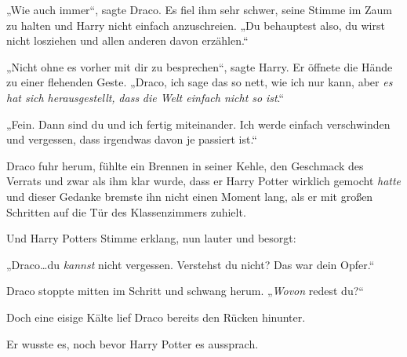„Wie auch immer“, sagte Draco. Es fiel ihm sehr schwer, seine Stimme im Zaum zu halten und Harry nicht einfach anzuschreien. „Du behauptest also, du wirst nicht losziehen und allen anderen davon erzählen.“

„Nicht ohne es vorher mit dir zu besprechen“, sagte Harry. Er öffnete die Hände zu einer flehenden Geste. „Draco, ich sage das so nett, wie ich nur kann, aber \emph{es hat sich herausgestellt,} \emph{dass} \emph{die Welt einfach nicht so} \emph{ist}.“

„Fein. Dann sind du und ich fertig miteinander. Ich werde einfach verschwinden und vergessen, dass irgendwas davon je passiert ist.“

Draco fuhr herum, fühlte ein Brennen in seiner Kehle, den Geschmack des Verrats und zwar als ihm klar wurde, dass er Harry Potter wirklich gemocht \emph{hatte} und dieser Gedanke bremste ihn nicht einen Moment lang, als er mit großen Schritten auf die Tür des Klassenzimmers zuhielt.

Und Harry Potters Stimme erklang, nun lauter und besorgt:

„Draco…du \emph{kannst} nicht vergessen. Verstehst du nicht? Das war dein Opfer.“

Draco stoppte mitten im Schritt und schwang herum. „\emph{Wovon} redest du?“

Doch eine eisige Kälte lief Draco bereits den Rücken hinunter.

Er wusste es, noch bevor Harry Potter es aussprach.


